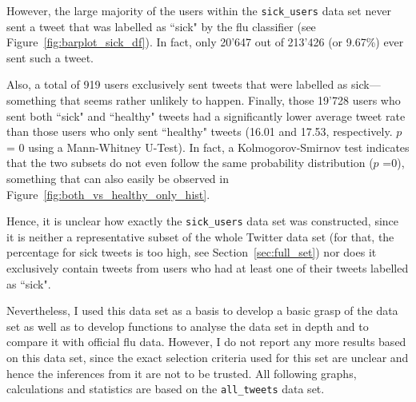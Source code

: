 \documentclass[11pt, a4paper,twoside]{report}\usepackage[]{graphicx}\usepackage[]{color}
\begin{document}
However, the large majority of the users within the \texttt{sick\_users} data set never sent a tweet that was labelled as ``sick" by the flu classifier (see Figure~\ref{fig:barplot_sick_df}). In fact, only 20'647 out of 213'426 (or 9.67\%) ever sent such a tweet.

Also, a total of 919 users exclusively sent tweets that were labelled as sick---something that seems rather unlikely to happen. Finally, those 19'728 users who sent both ``sick" and ``healthy" tweets had a significantly lower average tweet rate than those users who only sent ``healthy" tweets (16.01 and 17.53, respectively. $p$ = 0 using a Mann-Whitney U-Test). In fact, a Kolmogorov-Smirnov test indicates that the two subsets do not even follow the same probability distribution ($p$ =0), something that can also easily be observed in Figure~\ref{fig:both_vs_healthy_only_hist}.

Hence, it is unclear how exactly the \texttt{sick\_users} data set was constructed, since it is neither a representative subset of the whole Twitter data set (for that, the percentage for sick tweets is too high, see Section~\ref{sec:full_set}) nor does it exclusively contain tweets from users who had at least one of their tweets labelled as ``sick".

Nevertheless, I used this data set as a basis to develop a basic grasp of the data set as well as to develop functions to analyse the data set in depth and to compare it with official flu data. However, I do not report any more results based on this data set, since the exact selection criteria used for this set are unclear and hence the inferences from it are not to be trusted. All following graphs, calculations and statistics are based on the \texttt{all\_tweets} data set.\newpage
\end{document}
